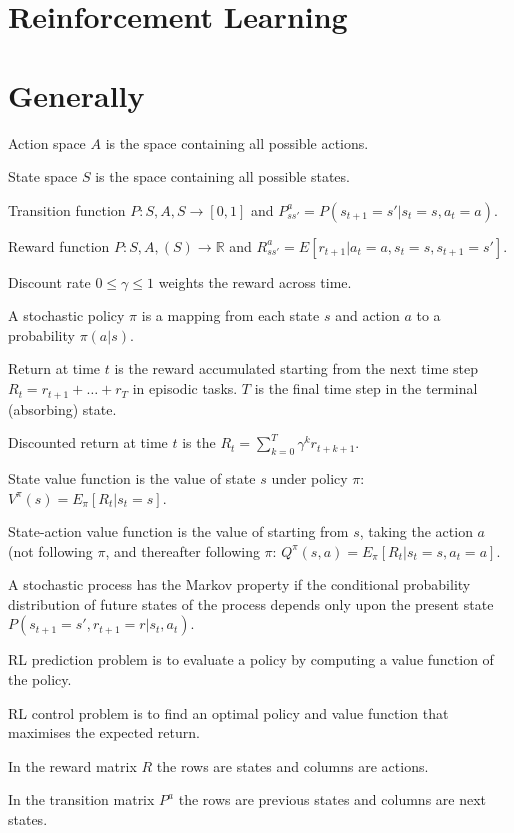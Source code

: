 \documentclass[twocolumn]{article}
\begin{document}
\section*{Reinforcement Learning}

\section{Generally}

Action space $A$ is the space containing all possible actions.

State space $S$ is the space containing all possible states.

Transition function $P:S,A,S\to[0,1]$ and $P^a_{ss'}=P(s_{t+1}=s'|s_t=s,a_t=a)$.

Reward function $P:S,A,(S)\to \mathbb{R}$ and $R^a_{ss'}=E[r_{t+1}|a_t=a,s_t=s,s_{t+1}=s']$.

Discount rate $0\le\gamma\le1$ weights the reward across time.

A stochastic policy $\pi$ is a mapping from each state $s$ and action $a$ to a probability $\pi(a|s)$.

Return at time $t$ is the reward accumulated starting from the next time step $R_t=r_{t+1}+\ldots+r_T$ in episodic tasks. $T$ is the final time step in the terminal (absorbing) state.

Discounted return at time $t$ is the $R_t=\sum_{k=0}^T\gamma^k r_{t+k+1}$.

State value function is the value of state $s$ under policy $\pi$: $V^\pi(s)=E_\pi[R_t|s_t=s]$.

State-action value function is the value of starting from $s$, taking the action $a$ (not following $\pi$, and thereafter following $\pi$: $Q^\pi(s,a)=E_\pi[R_t|s_t=s,a_t=a]$.

A stochastic process has the Markov property if the conditional probability distribution of future states of the process depends only upon the present state $P(s_{t+1}=s',r_{t+1}=r|s_t,a_t)$.

RL prediction problem is to evaluate a policy by computing a value function of the policy.

RL control problem is to find an optimal policy and value function that maximises the expected return.

In the reward matrix $R$ the rows are states and columns are actions.

In the transition matrix $P^a$ the rows are previous states and columns are next states.
\end{document}
